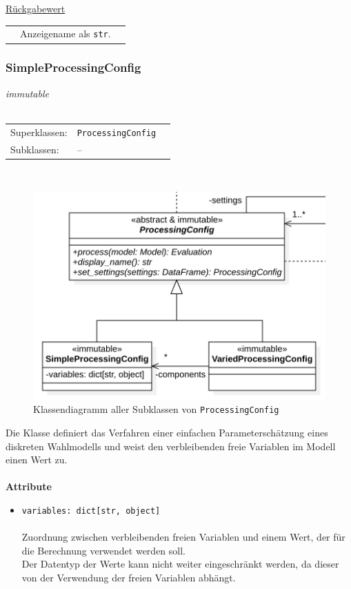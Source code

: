 \documentclass{article}
\begin{document}
\begin{itemize}
\begin{itemize}
\underline{Rückgabewert}\\
\begin{tabular}{lll}
 & Anzeigename als \texttt{str}.\\
\end{tabular}
\end{itemize}

\newpage
\subsubsection*{\large{\textbf{SimpleProcessingConfig}\label{cls:SimpleProcessingConfig}}}
\textit{\flqq{}immutable\frqq}\normalsize\\\\
\begin{tabular}{lll}
 Superklassen: & \texttt{ProcessingConfig}\\
 Subklassen: & --
\end{tabular}\\
\begin{figure}[H]%
    \centering
    \includegraphics[width=13cm]{entwurf/Entwurf_dokument/img/cls/model/ProcessingConfigs.png}
    \caption{Klassendiagramm aller Subklassen von \texttt{ProcessingConfig}}
\end{figure}

Die Klasse definiert das Verfahren einer einfachen Parameterschätzung eines diskreten Wahlmodells und weist den verbleibenden freie Variablen im Modell einen Wert zu.
\\\\

\textbf{Attribute}
\begin{itemize}\setlength\itemsep{3em}
\item \texttt{variables: dict[str, object]}\\\\
Zuordnung zwischen verbleibenden freien Variablen und einem Wert, der für die Berechnung verwendet werden soll.\\
Der Datentyp der Werte kann nicht weiter eingeschränkt werden, da dieser von der Verwendung der freien Variablen abhängt.
\\\\
\end{itemize}


\end{itemize}
\end{document}
